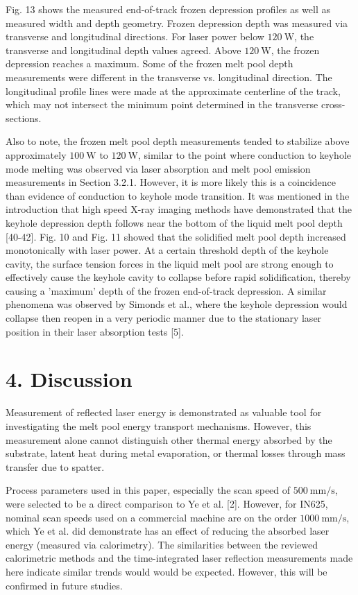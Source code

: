 \documentclass[10pt]{article}
\begin{document}
Fig. 13 shows the measured end-of-track frozen depression profiles as well as measured width and depth geometry. Frozen depression depth was measured via transverse and longitudinal directions. For laser power below $120 \mathrm{~W}$, the transverse and longitudinal depth values agreed. Above $120 \mathrm{~W}$, the frozen depression reaches a maximum. Some of the frozen melt pool depth measurements were different in the transverse vs. longitudinal direction. The longitudinal profile lines were made at the approximate centerline of the track, which may not intersect the minimum point determined in the transverse cross-sections.

Also to note, the frozen melt pool depth measurements tended to stabilize above approximately $100 \mathrm{~W}$ to $120 \mathrm{~W}$, similar to the point where conduction to keyhole mode melting was observed via laser absorption and melt pool emission measurements in Section 3.2.1. However, it is more likely this is a coincidence than evidence of conduction to keyhole mode transition. It was mentioned in the introduction that high speed X-ray imaging methods have demonstrated that the keyhole depression depth follows near the bottom of the liquid melt pool depth [40-42]. Fig. 10 and Fig. 11 showed that the solidified melt pool depth increased monotonically with laser power. At a certain threshold depth of the keyhole cavity, the surface tension forces in the liquid melt pool are strong enough to effectively cause the keyhole cavity to collapse before rapid solidification, thereby causing a 'maximum' depth of the frozen end-of-track depression. A similar phenomena was observed by Simonds et al., where the keyhole depression would collapse then reopen in a very periodic manner due to the stationary laser position in their laser absorption tests [5].

\section*{4. Discussion}
Measurement of reflected laser energy is demonstrated as valuable tool for investigating the melt pool energy transport mechanisms. However, this measurement alone cannot distinguish other thermal energy absorbed by the substrate, latent heat during metal evaporation, or thermal losses through mass transfer due to spatter.

Process parameters used in this paper, especially the scan speed of $500 \mathrm{~mm} / \mathrm{s}$, were selected to be a direct comparison to Ye et al. [2]. However, for IN625, nominal scan speeds used on a commercial machine are on the order $1000 \mathrm{~mm} / \mathrm{s}$, which Ye et al. did demonstrate has an effect of reducing the absorbed laser energy (measured via calorimetry). The similarities between the reviewed calorimetric methods and the time-integrated laser reflection measurements made here indicate similar trends would would be expected. However, this will be confirmed in future studies.
\end{document}
